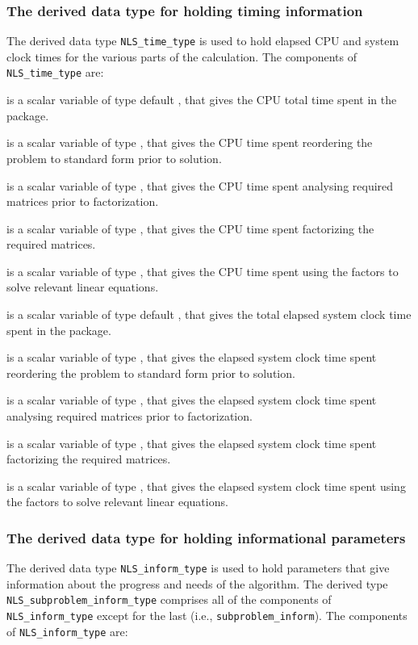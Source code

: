 \documentclass{galahad}
\newcommand{\packagename}{NLS}
\begin{document}
\subsubsection{The derived data type for holding timing
 information}\label{typetime}
The derived data type
{\tt \packagename\_time\_type}
is used to hold elapsed CPU and system clock times for the various parts
of the calculation. The components of
{\tt \packagename\_time\_type}
are:
\begin{description}
 is a scalar variable of type default \real, that gives
 the CPU total time spent in the package.

 is a scalar variable of type \realdp, that gives
 the CPU time spent reordering the problem to standard form prior to solution.

 is a scalar variable of type \realdp, that gives
 the CPU time spent analysing required matrices prior to factorization.

 is a scalar variable of type \realdp, that gives
 the CPU time spent factorizing the required matrices.

 is a scalar variable of type \realdp, that gives
 the CPU time spent using the factors to solve relevant linear equations.

 is a scalar variable of type default \real, that gives
 the total elapsed system clock time spent in the package.

 is a scalar variable of type \realdp, that gives
 the elapsed system clock time spent reordering the problem to standard form
prior to solution.

 is a scalar variable of type \realdp, that gives
 the  elapsed system clock time spent analysing required matrices prior to
factorization.

 is a scalar variable of type \realdp, that gives
 the  elapsed system clock time spent factorizing the required matrices.

 is a scalar variable of type \realdp, that gives
 the  elapsed system clock time spent using the factors to solve relevant
linear equations.

\end{description}


\subsubsection{The derived data type for holding informational
 parameters}\label{typeinform}
The derived data type
{\tt \packagename\_inform\_type}
is used to hold parameters that give information about the progress and needs
of the algorithm.
The derived type {\tt \packagename\_subproblem\_inform\_type}
comprises all of the components of {\tt \packagename\_inform\_type}
except for the last (i.e., {\tt subproblem\_inform}).
The components of
{\tt \packagename\_inform\_type}
are:
\end{document}
